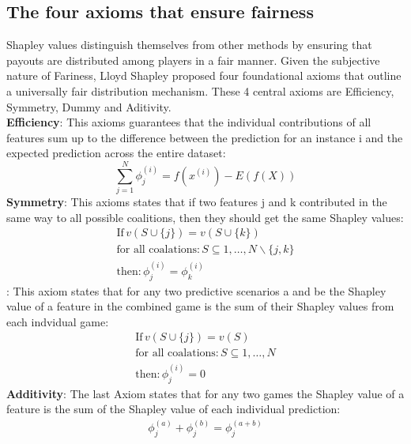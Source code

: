 \documentclass[12pt]{article}
\begin{document}
\subsection{The four axioms that ensure fairness}
Shapley values distinguish themselves from other methods by ensuring that payouts are distributed among players in a fair manner. Given the subjective nature of Fariness, Lloyd Shapley proposed four foundational axioms that outline a universally fair distribution mechanism. 
These 4 central axioms are Efficiency, Symmetry, Dummy and Aditivity.\\
\textbf{Efficiency}: This axioms guarantees that the individual contributions of all features sum up to the difference between the prediction for an instance i and the expected prediction across the entire dataset:
\begin{equation}
\sum_{j=1}^{N} \phi^{(i)}_j = f(x^{(i)}) - E(f(X))
\end{equation}
\textbf{Symmetry}: This axioms states that if two features j and k contributed in the same way to all possible coalitions, then they should get the same Shapley values:
\begin{align*}
\text{If} \, v(S \cup \{j\})  = v(S \cup \{k\})\\
\text{for all coalations:} \, {S \subseteq {1,\ldots,N}\backslash\{j,k\}}\\
\text{then:} \,  \phi^{(i)}_j  = \phi^{(i)}_k
\end{align*}
: This axiom states that for any two predictive scenarios a and be the Shapley value of a feature in the combined game is the sum of their Shapley values from each indvidual game:
\begin{align*}
	\text{If} \, v(S \cup \{j\})  = v(S)\\
	\text{for all coalations:} \, {S \subseteq {1,\ldots,N}}\\
	\text{then:} \,  \phi^{(i)}_j  = 0
\end{align*}
\textbf{Additivity}: The last Axiom states that for any two games the Shapley value of a feature is the sum of the Shapley value of each individual prediction:
\begin{align}
\phi^{(a)}_j + \phi^{(b)}_j = \phi^{(a+b)}_j
\end{align}
\end{document}
